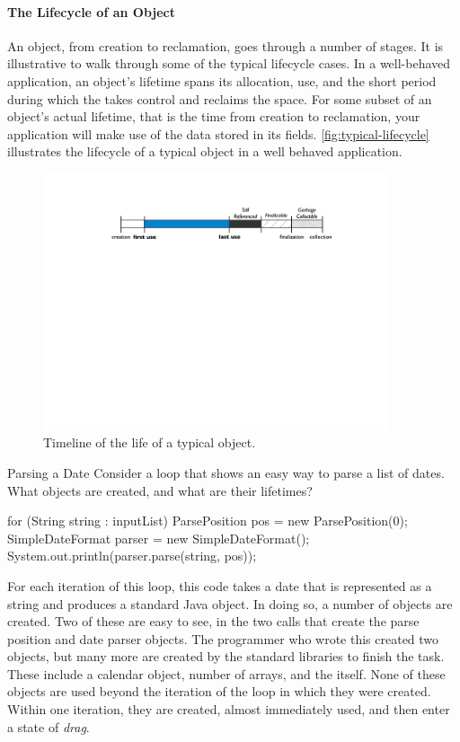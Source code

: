 \paragraph{The Lifecycle of an Object}
An object, from creation to reclamation, goes through a number of 
stages. It is illustrative to walk through some of the typical lifecycle cases.
In a well-behaved application, an object's lifetime spans its allocation,
use, and the short period during which the \jre takes control and reclaims the
space. For some subset of an object's actual lifetime, that is the time from
creation to reclamation, your application will make use of the data stored in its
fields. \autoref{fig:typical-lifecycle} illustrates the lifecycle of a typical
object in a well behaved application.

\begin{figure}
	\includegraphics[width=0.9\textwidth]{part4/Figures/lifetime/object-lifecycle}
	\caption{Timeline of the life of a typical object.}
	\label{fig:typical-lifecycle}
\end{figure}


\begin{example}{Parsing a Date} Consider a loop that shows an easy way to parse
a list of dates. What objects are created, and what are their lifetimes?
\begin{shortlisting}
for (String string : inputList) {
	ParsePosition pos = new ParsePosition(0);
	SimpleDateFormat parser = new SimpleDateFormat();
	System.out.println(parser.parse(string, pos));
}
\end{shortlisting}
\end{example}

For each iteration of this loop, this code takes a date that is represented as a
string and produces a standard Java  object. In doing so, a number of
objects are created. Two of these are easy to see, in the two  calls
that create the parse position and date parser objects. The programmer who wrote
this created two objects, but many more are created by the standard libraries to
finish the task. These include a calendar object, number of arrays, and the
 itself. None of these objects are used beyond the iteration of the
loop in which they were created. Within one iteration, they are created, almost
immediately used, and then enter a state of \emph{drag}.

